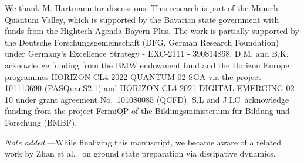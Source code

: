 \documentclass[aps,prx,twocolumn,superscriptaddress,nofootinbib,nolongbibliography,nobalancelastpage,10pt,floatfix]{revtex4-2}
\begin{document}
\begin{acknowledgments}
    We thank M. Hartmann for discussions.
    This research is part of the Munich Quantum Valley, which is supported by the Bavarian state government with funds from the Hightech Agenda Bayern Plus.
    The work is partially supported by the Deutsche Forschungsgemeinschaft (DFG, German Research Foundation) under Germany's Excellence Strategy - EXC-2111 - 390814868.
    D.M. and B.K. acknowledge funding from the BMW endowment fund and the Horizon Europe programmes HORIZON-CL4-2022-QUANTUM-02-SGA via the project 101113690 (PASQuanS2.1) and HORIZON-CL4-2021-DIGITAL-EMERGING-02-10 under grant agreement No.~101080085 (QCFD).
    S.L and J.I.C~acknowledge funding from the project FermiQP of the Bildungsministerium für Bildung und Forschung (BMBF).
\end{acknowledgments}

\textit{Note added.}---While finalizing this manuscript, we became aware of a related work by Zhan et al.~\cite{Zhan2026Rapid} on ground state preparation via dissipative dynamics.

\FloatBarrier

\clearpage
\appendix



\FloatBarrier



\end{document}
